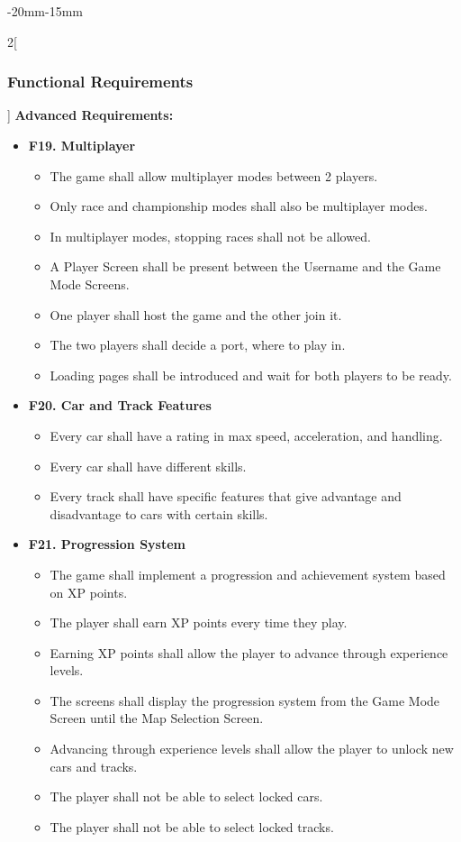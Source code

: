 \documentclass[12pt]{article}
\begin{document}
\begin{adjustwidth}{-20mm}{-15mm}
\begin{multicols}{2}[\subsubsection{Functional Requirements}]
\vspace{6pt}
\noindent\textbf{Advanced Requirements:}
\begin{itemize}[leftmargin=*]
\item \textbf{F19. Multiplayer}
\begin{itemize}[leftmargin=*]
\item The game shall allow multiplayer modes between 2 players.
\item Only race and championship modes shall also be multiplayer modes.
\item In multiplayer modes, stopping races shall not be allowed.
\item A Player Screen shall be present between the Username and the Game Mode Screens.
\item One player shall host the game and the other join it.
\item The two players shall decide a port, where to play in.
\item Loading pages shall be introduced and wait for both players to be ready.
\end{itemize}

\item \textbf{F20. Car and Track Features}
\begin{itemize}[leftmargin=*]
\item Every car shall have a rating in max speed, acceleration, and handling.
\item Every car shall have different skills.
\item Every track shall have specific features that give advantage and disadvantage to cars with certain skills.
\end{itemize}

\item \textbf{F21. Progression System}
\begin{itemize}[leftmargin=*]
\item The game shall implement a progression and achievement system based on XP points.
\item The player shall earn XP points every time they play.
\item Earning XP points shall allow the player to advance through experience levels.
\item The screens shall display the progression system from the Game Mode Screen until the Map Selection Screen.
\item Advancing through experience levels shall allow the player to unlock new cars and tracks.
\item The player shall not be able to select locked cars.
\item The player shall not be able to select locked tracks.
\end{itemize}
\end{itemize}
\end{multicols}
\end{adjustwidth}
\end{document}
